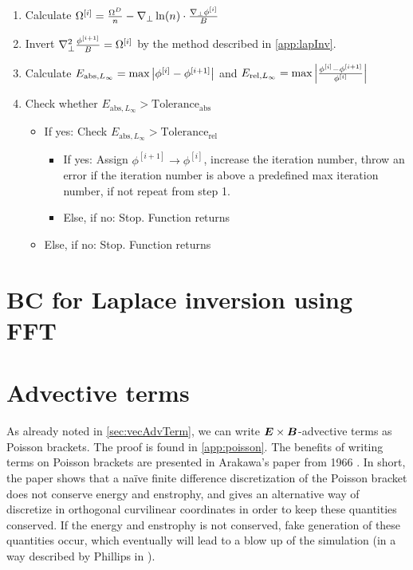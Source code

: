 \begin{algorithm}
\begin{enumerate}
    \item Calculate
        $ \Omega^{[i]} = \frac{\Omega^D}{n} -
        \nabla_\perp \ln(n) \cdot\frac{\nabla_\perp\phi^{[i]}}{B}
        $
    \item Invert $\nabla_\perp^2 \frac{\phi^{[i+1]}}{B} = \Omega^{[i]}$ by the method
        described in \cref{app:lapInv}.
    \item Calculate
        $E_{\text{abs}, L_\infty} = \text{max} \left|\phi^{[i]} - \phi^{[i+1]}\right|$
        and
        $E_{\text{rel}, L_\infty} = \text{max} \left|\frac{\phi^{[i]} - \phi^{[i+1]}}{\phi^{[i]}}\right|$
    \item Check whether $E_{\text{abs}, L_\infty} > \text{Tolerance}_\text{abs}$
    \begin{itemize}[noitemsep,nolistsep]
        \item If yes: Check $E_{\text{abs}, L_\infty} > \text{Tolerance}_\text{rel}$
            \begin{itemize}[noitemsep,nolistsep]
                \item If yes: Assign $\phi^{[i+1]} \to \phi^{[i]}$, increase the
                    iteration number, throw an error if the iteration number is
                    above a predefined max iteration number, if not repeat from
                    step 1.
                \item Else, if no: Stop. Function returns
            \end{itemize}
        \item Else, if no: Stop. Function returns
    \end{itemize}
\end{enumerate}
\end{algorithm}

\section{BC for Laplace inversion using FFT}
%
\section{Advective terms}
\label{sec:ExBadv}
%
As already noted in \cref{sec:vecAdvTerm}, we can write $\boldsymbol{E}\times\boldsymbol{B}$-advective terms as Poisson brackets.
The proof is found in \cref{app:poisson}.
The benefits of writing terms on Poisson brackets are presented in Arakawa's paper from 1966 \cite{Arakwa1966}.
In short, the paper shows that a na\"ive finite difference discretization of the Poisson bracket does not conserve energy and enstrophy, and gives an alternative way of discretize in orthogonal curvilinear coordinates in order to keep these quantities conserved.
If the energy and enstrophy is not conserved, fake generation of these quantities occur, which eventually will lead to a blow up of the simulation (in a way described by Phillips in \cite{Phillips1959}).

